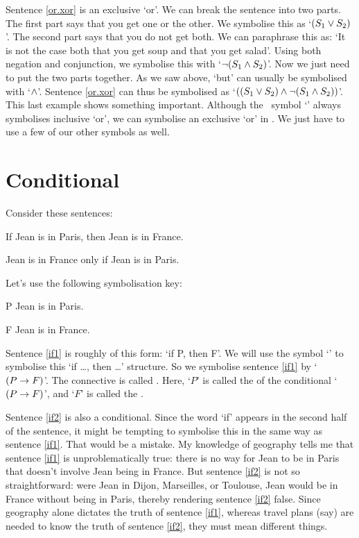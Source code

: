 Sentence \ref{or.xor} is an exclusive `or'. We can break the sentence into two parts. The first part says that you get one or the other. We symbolise this as `$(S_1 \vee S_2)$'. The second part says that you do not get both. We can paraphrase this as: `It is not the case both that you get soup and that you get salad'. Using both negation and conjunction, we symbolise this with `$\neg(S_1 \wedge S_2)$'. Now we just need to put the two parts together. As we saw above, `but' can usually be symbolised with `$\wedge$'. Sentence \ref{or.xor} can thus be symbolised as `$((S_1 \vee S_2) \wedge \neg(S_1 \wedge S_2))$'. This last example shows something important. Although the \TFL\ symbol `\eor' always symbolises inclusive `or', we can symbolise an exclusive `or' in \TFL. We just have to use a few of our other symbols as well.


\section{Conditional}
Consider these sentences:
	\begin{earg}
		\item[\ex{if1}] If Jean is in Paris, then Jean is in France.
		\item[\ex{if2}] Jean is in France only if Jean is in Paris.
	\end{earg}
Let's use the following symbolisation key:
	\begin{ekey}
		\item[P] Jean is in Paris.
		\item[F] Jean is in France.
	\end{ekey}
Sentence \ref{if1} is roughly of this form: `if P, then F'. We will use the symbol `\eif' to symbolise this `if …, then …' structure. So we symbolise sentence \ref{if1} by `$(P\rightarrow F)$'. The connective is called . Here, `$P$' is called the  of the conditional `$(P \rightarrow F)$', and `$F$' is called the .

Sentence \ref{if2} is also a conditional. Since the word `if' appears in the second half of the sentence, it might be tempting to symbolise this in the same way as sentence \ref{if1}. That would be a mistake. My knowledge of geography tells me that sentence \ref{if1} is unproblematically true: there is no way for Jean to be in Paris that doesn't involve Jean being in France. But sentence \ref{if2} is not so straightforward: were Jean in Dijon, Marseilles, or Toulouse, Jean would be in France without being in Paris, thereby rendering sentence \ref{if2} false. Since geography alone dictates the truth of sentence \ref{if1}, whereas travel plans (say) are needed to know the truth of sentence \ref{if2}, they must mean different things.

